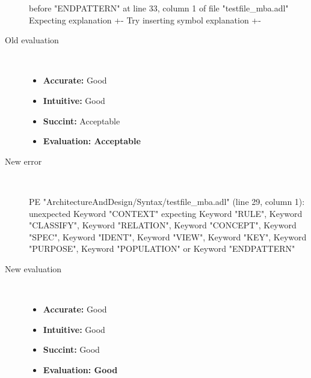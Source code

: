 \begin{description}
\begin{haskell}
before "ENDPATTERN" at line 33, column 1 of file "testfile_mba.adl"
Expecting explanation {+-}
Try inserting symbol explanation {+-}\end{haskell}
  \item[Old evaluation]~\\
    \begin{itemize}
    \item \textbf{Accurate:} Good
    \item \textbf{Intuitive:} Good
    \item \textbf{Succint:} Acceptable
    \item \textbf{Evaluation: Acceptable}
    \end{itemize}
  \item[New error]~\\
\begin{haskell}
PE "ArchitectureAndDesign/Syntax/testfile_mba.adl" (line 29, column 1):
unexpected Keyword "CONTEXT"
expecting Keyword "RULE", Keyword "CLASSIFY", Keyword "RELATION", Keyword "CONCEPT", Keyword "SPEC", Keyword "IDENT", Keyword "VIEW", Keyword "KEY", Keyword "PURPOSE", Keyword "POPULATION" or Keyword "ENDPATTERN"
\end{haskell}
  \item[New evaluation]~\\
    \begin{itemize}
    \item \textbf{Accurate:} Good
    \item \textbf{Intuitive:} Good
    \item \textbf{Succint:} Good
    \item \textbf{Evaluation: Good
}
    \end{itemize}
  \end{description}

\hrulefill

